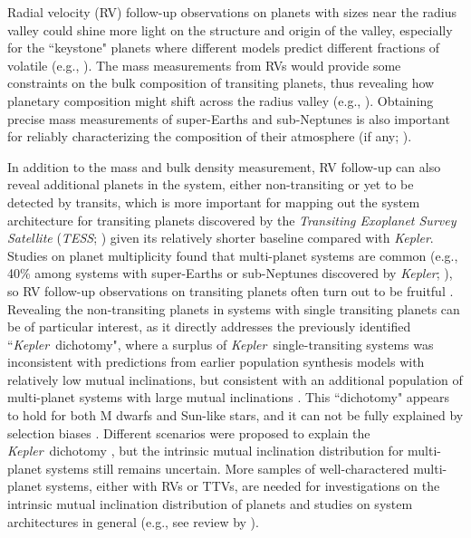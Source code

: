 \documentclass[twocolumn]{aastex631}
\newcommand{\kepler}{\textit{Kepler}\ }
\begin{document}
Radial velocity (RV) follow-up observations on planets with sizes near the radius valley could shine more light on the structure and origin of the valley, especially for the ``keystone" planets where different models predict different fractions of volatile (e.g., \citealt{Cloutier&Menou2020,Cloutier2020}). The mass measurements from RVs would provide some constraints on the bulk composition of transiting planets, thus revealing how planetary composition might shift across the radius valley (e.g., \citealt{Luque2022}). Obtaining precise mass measurements of super-Earths and sub-Neptunes is also important for reliably characterizing the composition of their atmosphere (if any; \citealt{batalha2019}).

In addition to the mass and bulk density measurement, RV follow-up can also reveal additional planets in the system, either non-transiting or yet to be detected by transits, which is more important for mapping out the system architecture for transiting planets discovered by the \textit{Transiting Exoplanet Survey Satellite} (\textit{TESS}; \citealt{ricker2015}) given its relatively shorter baseline compared with \textit{Kepler}. Studies on planet multiplicity found that multi-planet systems are common (e.g., 40\% among systems with super-Earths or sub-Neptunes discovered by \textit{Kepler}; \citealt{batalha2013}), so RV follow-up observations on transiting planets often turn out to be fruitful \citep[e.g.,][]{Lacedelli2021,Lubin2022}. Revealing the non-transiting planets in systems with single transiting planets can be of particular interest, as it directly addresses the previously identified ``\kepler dichotomy", where a surplus of \kepler single-transiting systems was inconsistent with predictions from earlier population synthesis models with relatively low mutual inclinations, but consistent with an additional population of multi-planet systems with large mutual inclinations \citep[e.g.,][]{lissauer2011,hansen2013,ballardjohnson2016}. This ``dichotomy" appears to hold for both M dwarfs and Sun-like stars, and it can not be fully explained by selection biases \citep[e.g.][]{Zink2019}. Different scenarios were proposed to explain the \kepler dichotomy \citep[e.g.][]{Mulders2018, zhu2018, He2019, He2020}, but the intrinsic mutual inclination distribution for multi-planet systems still remains uncertain. More samples of well-charactered multi-planet systems, either with RVs or TTVs, are needed for investigations on the intrinsic mutual inclination distribution of planets and studies on system architectures in general (e.g., see review by \citealt{Weiss2022}).
\end{document}
